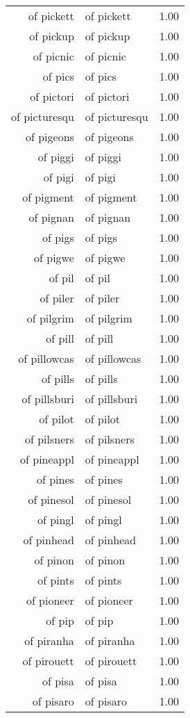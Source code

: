 \begin{table}[ht]
\begin{tabular}{rlr}
  of pickett & of pickett & 1.00 \\ 
  of pickup & of pickup & 1.00 \\ 
  of picnic & of picnic & 1.00 \\ 
  of pics & of pics & 1.00 \\ 
  of pictori & of pictori & 1.00 \\ 
  of picturesqu & of picturesqu & 1.00 \\ 
  of pigeons & of pigeons & 1.00 \\ 
  of piggi & of piggi & 1.00 \\ 
  of pigi & of pigi & 1.00 \\ 
  of pigment & of pigment & 1.00 \\ 
  of pignan & of pignan & 1.00 \\ 
  of pigs & of pigs & 1.00 \\ 
  of pigwe & of pigwe & 1.00 \\ 
  of pil & of pil & 1.00 \\ 
  of piler & of piler & 1.00 \\ 
  of pilgrim & of pilgrim & 1.00 \\ 
  of pill & of pill & 1.00 \\ 
  of pillowcas & of pillowcas & 1.00 \\ 
  of pills & of pills & 1.00 \\ 
  of pillsburi & of pillsburi & 1.00 \\ 
  of pilot & of pilot & 1.00 \\ 
  of pilsners & of pilsners & 1.00 \\ 
  of pineappl & of pineappl & 1.00 \\ 
  of pines & of pines & 1.00 \\ 
  of pinesol & of pinesol & 1.00 \\ 
  of pingl & of pingl & 1.00 \\ 
  of pinhead & of pinhead & 1.00 \\ 
  of pinon & of pinon & 1.00 \\ 
  of pints & of pints & 1.00 \\ 
  of pioneer & of pioneer & 1.00 \\ 
  of pip & of pip & 1.00 \\ 
  of piranha & of piranha & 1.00 \\ 
  of pirouett & of pirouett & 1.00 \\ 
  of pisa & of pisa & 1.00 \\ 
  of pisaro & of pisaro & 1.00 \\ 

\end{tabular}
\end{table}
